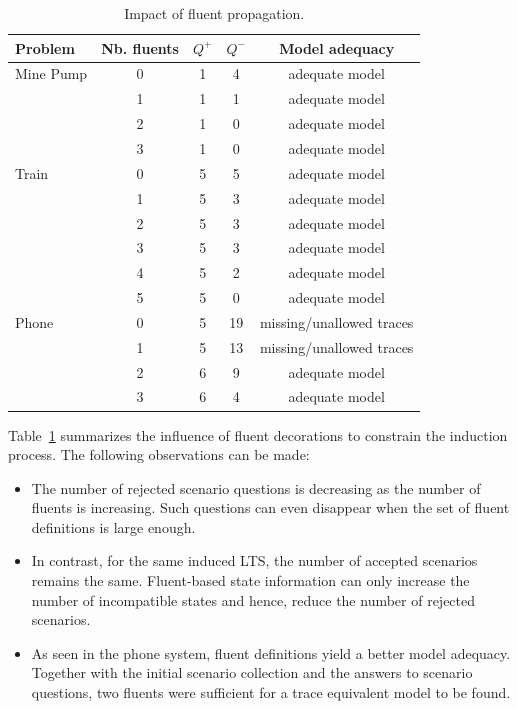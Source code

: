 \begin{table}[H]
\centering
\begin{tabular}{|l||c||c|c|c|}\hline
Problem&Nb. fluents&$Q^+$&$Q^-$&Model adequacy\\\hline\hline
Mine Pump&0&1&4&adequate model\\\cline{2-5}
&1&1&1&adequate model\\\cline{2-5}
&2&1&0&adequate model\\\cline{2-5}
&3&1&0&adequate model\\\hline\hline
Train&0&5&5&adequate model\\\cline{2-5}
&1&5&3&adequate model\\\cline{2-5}
&2&5&3&adequate model\\\cline{2-5}
&3&5&3&adequate model\\\cline{2-5}
&4&5&2&adequate model\\\cline{2-5}
&5&5&0&adequate model\\\hline\hline
Phone&0&5&19&missing/unallowed traces\\\cline{2-5}
&1&5&13&missing/unallowed traces\\\cline{2-5}
&2&6&9&adequate model\\\cline{2-5}
&3&6&4&adequate model\\\hline
\end{tabular}
\caption{Impact of fluent propagation.\label{Fluents:res}}
\end{table}

Table~\ref{Fluents:res} summarizes the influence of fluent decorations to constrain the induction process. The following observations can be made:
\begin{itemize}
\item The number of rejected scenario questions is decreasing as the number of fluents is increasing. Such questions can even disappear when the set of fluent definitions is large enough. 
\item In contrast, for the same induced LTS, the number of accepted scenarios remains the same. Fluent-based state information can only increase the number of incompatible states and hence, reduce the number of rejected scenarios.
\item As seen in the phone system, fluent definitions yield a better model adequacy. Together with the initial scenario collection and the answers to scenario questions, two fluents were sufficient for a trace equivalent model to be found.
\end{itemize}

